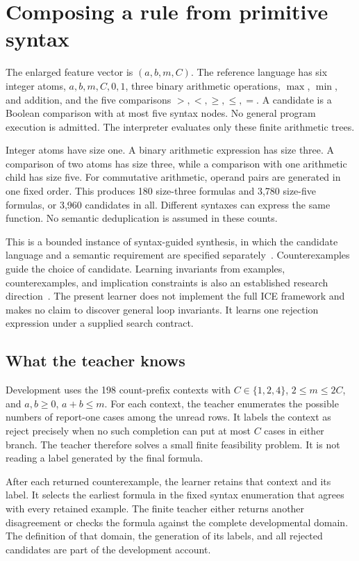 \section{Composing a rule from primitive syntax}\label{SII:sec:grammar-learning}
The enlarged feature vector is $(a,b,m,C)$. The reference language has six integer atoms, $a,b,m,C,0,1$, three binary arithmetic operations, $\max$, $\min$, and addition, and the five comparisons $>,<,\geq,\leq,=$. A candidate is a Boolean comparison with at most five syntax nodes. No general program execution is admitted. The interpreter evaluates only these finite arithmetic trees.

Integer atoms have size one. A binary arithmetic expression has size three. A comparison of two atoms has size three, while a comparison with one arithmetic child has size five. For commutative arithmetic, operand pairs are generated in one fixed order. This produces 180 size-three formulas and 3,780 size-five formulas, or 3,960 candidates in all. Different syntaxes can express the same function. No semantic deduplication is assumed in these counts.

This is a bounded instance of syntax-guided synthesis, in which the candidate language and a semantic requirement are specified separately~\cite{SII:sygus}. Counterexamples guide the choice of candidate. Learning invariants from examples, counterexamples, and implication constraints is also an established research direction~\cite{SII:ice}. The present learner does not implement the full ICE framework and makes no claim to discover general loop invariants. It learns one rejection expression under a supplied search contract.

\subsection{What the teacher knows}
Development uses the 198 count-prefix contexts with $C\in\{1,2,4\}$, $2\leq m\leq2C$, and $a,b\geq0$, $a+b\leq m$. For each context, the teacher enumerates the possible numbers of report-one cases among the unread rows. It labels the context as reject precisely when no such completion can put at most $C$ cases in either branch. The teacher therefore solves a small finite feasibility problem. It is not reading a label generated by the final formula.

After each returned counterexample, the learner retains that context and its label. It selects the earliest formula in the fixed syntax enumeration that agrees with every retained example. The finite teacher either returns another disagreement or checks the formula against the complete developmental domain. The definition of that domain, the generation of its labels, and all rejected candidates are part of the development account.

